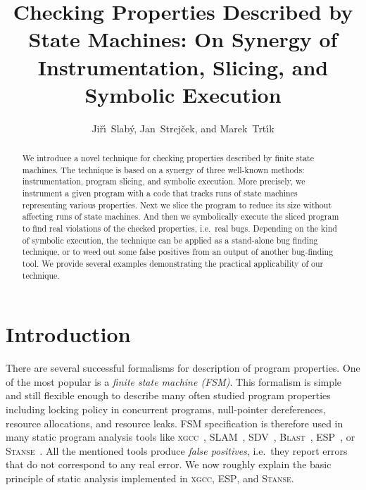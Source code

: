 \documentclass[10pt]{llncs}
\begin{document}

\title{Checking Properties Described by State Machines: On Synergy of
Instrumentation, Slicing, and Symbolic Execution}
\author{Ji\v{r}\'\i~Slab\'y, Jan~Strej\v{c}ek, and Marek~Trt\'{\i}k}

\maketitle

\begin{abstract}
  We introduce a novel technique for checking properties described by finite
  state machines. The technique is based on a synergy of three well-known
  methods: instrumentation, program slicing, and symbolic execution. More
  precisely, we instrument a given program with a code that tracks runs of
  state machines representing various properties. Next we slice the program
  to reduce its size without affecting runs of state machines. And then we
  symbolically execute the sliced program to find real violations of
  the checked properties, i.e.~real bugs. Depending on the kind of symbolic
  execution, the technique can be applied as a stand-alone bug finding
  technique, or to weed out some false positives from an output of another
  bug-finding tool. We provide several examples demonstrating the practical
  applicability of our technique.
\end{abstract}



\section{Introduction}
\label{sec:introduction}

There are several successful formalisms for description of program
properties.  One of the most popular is a \emph{finite state machine (FSM)}.
This formalism is simple and still flexible enough to describe many often
studied program properties including locking policy in concurrent programs,
null-pointer dereferences, resource allocations, and resource leaks. FSM
specification is therefore used in many static program analysis tools like
\textsc{xgcc}~\cite{pldi02}, \textsc{SLAM}~\cite{BLR11},
\textsc{SDV}~\cite{BBKL10}, \textsc{Blast}~\cite{BHJ07},
\textsc{ESP}~\cite{DLS02}, or \textsc{Stanse}~\cite{stanse}. All the mentioned
tools produce \emph{false positives}, i.e.~they report errors that do not
correspond to any real error. We now roughly explain the basic principle of
static analysis implemented in \textsc{xgcc}, \textsc{ESP}, and
\textsc{Stanse}.
\end{document}
